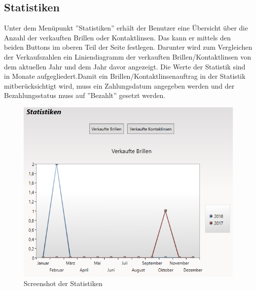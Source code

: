 \subsection{Statistiken}
Unter dem Menüpunkt ''Statistiken'' erhält der Benutzer eine Übersicht über die Anzahl der verkauften Brillen oder Kontaktlinsen. Das kann er mittels den beiden Buttons im oberen Teil der Seite festlegen. Darunter wird zum Vergleichen der Verkaufszahlen ein Liniendiagramm der verkauften Brillen/Kontaktlinsen von dem aktuellen Jahr und dem Jahr davor angezeigt. Die Werte der Statistik sind in Monate aufgegliedert.\newline Damit ein Brillen/Kontaktlinsenauftrag in der Statistik mitberücksichtigt wird, muss ein Zahlungsdatum angegeben werden und der Bezahlungsstatus muss auf ''Bezahlt'' gesetzt werden.
\begin{figure}[H]
\begin{center}
	\includegraphics[scale=.45]{images/Statistiken.png}
\end{center}
	\caption{Screenshot der Statistiken}
	\label{fig:sample}
\end{figure}
